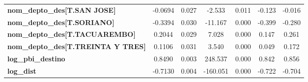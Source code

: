 \begin{center}
\begin{tabular}{lcccccc}
\textbf{nom\_depto\_des[T.SAN JOSE]}        &      -0.0694  &        0.027     &    -2.533  &         0.011        &       -0.123    &       -0.016     \\
\textbf{nom\_depto\_des[T.SORIANO]}         &      -0.3394  &        0.030     &   -11.167  &         0.000        &       -0.399    &       -0.280     \\
\textbf{nom\_depto\_des[T.TACUAREMBO]}      &       0.2044  &        0.029     &     7.028  &         0.000        &        0.147    &        0.261     \\
\textbf{nom\_depto\_des[T.TREINTA Y TRES]}  &       0.1106  &        0.031     &     3.540  &         0.000        &        0.049    &        0.172     \\
\textbf{log\_pbi\_destino}                  &       0.8490  &        0.003     &   248.537  &         0.000        &        0.842    &        0.856     \\
\textbf{log\_dist}                          &      -0.7130  &        0.004     &  -160.051  &         0.000        &       -0.722    &       -0.704     \\
\bottomrule
\end{tabular}
\end{center}